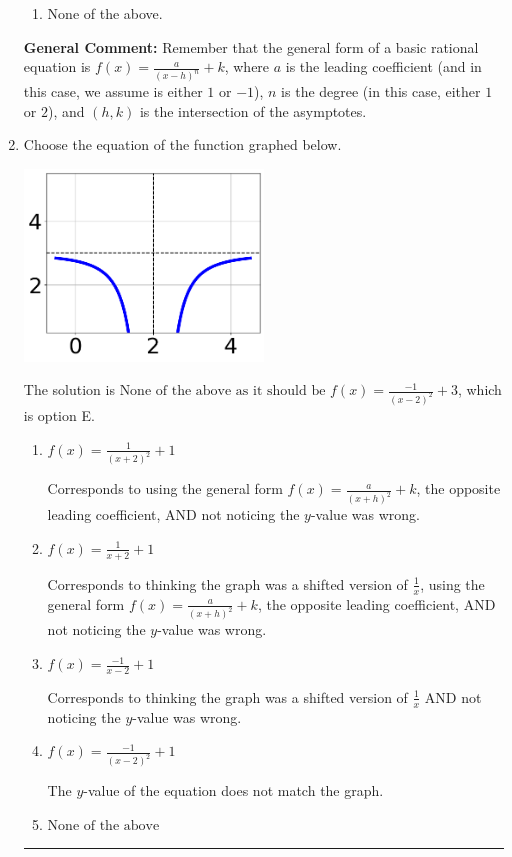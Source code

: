 \documentclass{extbook}[14pt]
\newcommand{\litem}[1]{\item #1

\rule{\textwidth}{0.4pt}}
\begin{document}
\begin{enumerate}
{\begin{enumerate}[label=\Alph*.]
\begin{multicols}{2}
\end{multicols}\item None of the above.\end{enumerate}
\textbf{General Comment:} Remember that the general form of a basic rational equation is $ f(x) = \frac{a}{(x-h)^n} + k$, where $a$ is the leading coefficient (and in this case, we assume is either $1$ or $-1$), $n$ is the degree (in this case, either $1$ or $2$), and $(h, k)$ is the intersection of the asymptotes.
}
\litem{
Choose the equation of the function graphed below.

\begin{center}
    \includegraphics[width=0.5\textwidth]{../Figures/rationalGraphToEquationB.png}
\end{center}



The solution is \( \text{None of the above as it should be } f(x) = \frac{-1}{(x - 2)^2} + 3 \), which is option E.\begin{enumerate}[label=\Alph*.]
\item \( f(x) = \frac{1}{(x + 2)^2} + 1 \)

Corresponds to using the general form $f(x) = \frac{a}{(x+h)^2}+k$, the opposite leading coefficient, AND not noticing the $y$-value was wrong.
\item \( f(x) = \frac{1}{x + 2} + 1 \)

Corresponds to thinking the graph was a shifted version of $\frac{1}{x}$, using the general form $f(x) = \frac{a}{(x+h)^2}+k$, the opposite leading coefficient, AND not noticing the $y$-value was wrong.
\item \( f(x) = \frac{-1}{x - 2} + 1 \)

Corresponds to thinking the graph was a shifted version of $\frac{1}{x}$ AND not noticing the $y$-value was wrong.
\item \( f(x) = \frac{-1}{(x - 2)^2} + 1 \)

The $y$-value of the equation does not match the graph.
\item \( \text{None of the above} \)


\end{enumerate}}
\end{enumerate}
\end{document}
